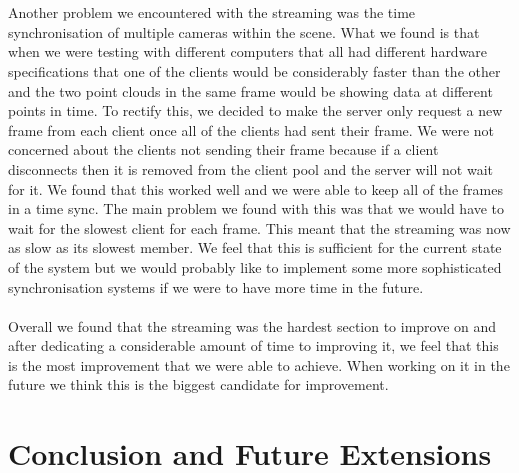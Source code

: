 \documentclass{article}
\begin{document}
\\\\
Another problem we encountered with the streaming was the time synchronisation of multiple cameras within the scene. What we found is that when we were testing with different computers that all had different hardware specifications that one of the clients would be considerably faster than the other and the two point clouds in the same frame would be showing data at different points in time. To rectify this, we decided to make the server only request a new frame from each client once all of the clients had sent their frame. We were not concerned about the clients not sending their frame because if a client disconnects then it is removed from the client pool and the server will not wait for it. We found that this worked well and we were able to keep all of the frames in a time sync. The main problem we found with this was that we would have to wait for the slowest client for each frame. This meant that the streaming was now as slow as its slowest member. We feel that this is sufficient for the current state of the system but we would probably like to implement some more sophisticated synchronisation systems if we were to have more time in the future.
\\\\
Overall we found that the streaming was the hardest section to improve on and after dedicating a considerable amount of time to improving it, we feel that this is the most improvement that we were able to achieve. When working on it in the future we think this is the biggest candidate for improvement.
\newpage
\section{Conclusion and Future Extensions}

\iffalse %
\end{document}
